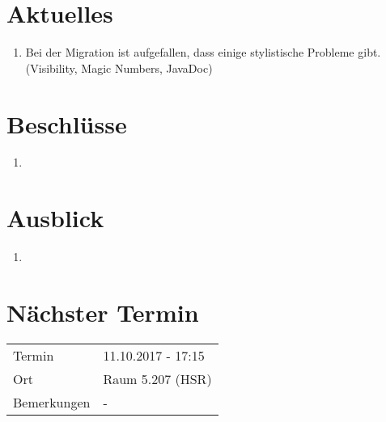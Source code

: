 \documentclass[11pt, a4paper,oneside]{scrartcl}
\begin{document}
\section{Aktuelles}
\begin{enumerate}
	\item Bei der Migration ist aufgefallen, dass einige stylistische Probleme gibt. (Visibility, Magic Numbers, JavaDoc)
\end{enumerate}

\section{Beschlüsse}
\begin{enumerate}
	\item
\end{enumerate}

\section{Ausblick}
\begin{enumerate}
	\item 
\end{enumerate}

\section{Nächster Termin}
\begin{tabu} to \linewidth {l X }
	\toprule
	Termin & 11.10.2017 - 17:15 \\
	Ort & Raum 5.207 (HSR) \\
	Bemerkungen & - \\
	\bottomrule
\end{tabu}
\end{document}
